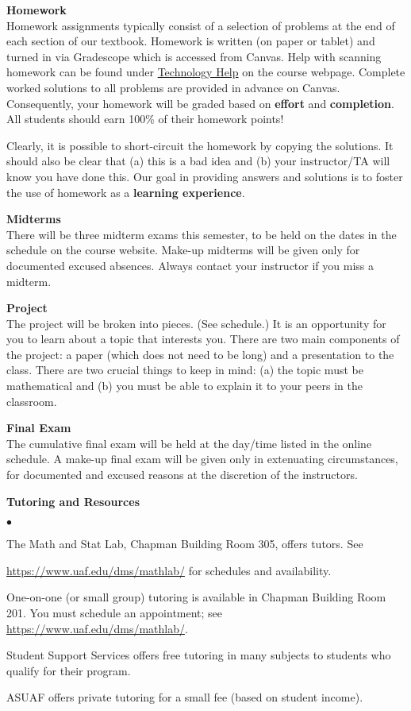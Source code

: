 \documentclass[12pt]{article}
\renewcommand{\emph}[1]{\textsf{\textbf{#1}}}
\newcommand{\localhead}[1]{\par\smallskip\textbf{#1}\nobreak\\}%
\def\heading#1{\localhead{\large\emph{#1}}}
\newenvironment{clist}%
{\bgroup\parskip 0pt\begin{list}{$\bullet$}{\partopsep 4pt\topsep 0pt\itemsep -2pt}}%
{\end{list}\egroup}%
\begin{document}
\heading{Homework}
Homework assignments typically consist of a selection of problems at the end of each section of our textbook. Homework is written (on paper or tablet) and turned in via Gradescope which is accessed from Canvas.  Help with scanning homework can be found under \href{https://jrfaudree.github.io/HOM2023/techHelp.html}{Technology Help} on the course webpage. Complete worked solutions to all problems are provided in advance on Canvas. Consequently, your homework will be graded based on \emph{effort} and \emph{completion}.  All students should earn 100\% of their homework points!

Clearly, it is possible to short-circuit the homework by copying the solutions. It should also be clear that (a) this is a bad idea and (b) your instructor/TA will know you have done this. Our goal in providing answers and solutions is to foster the use of homework as a \emph{learning experience}. 

\heading{Midterms}
There will be three midterm exams this semester, to be held on the dates
in the schedule on the course website. Make-up midterms will be given only for documented excused absences. Always contact your instructor if you miss a midterm.

\heading{Project}
The project will be broken into pieces. (See schedule.) It is an opportunity for you to learn about a topic that interests you. There are two main components of the project: a paper (which does not need to be long) and a presentation to the class. There are two crucial things to keep in mind: (a) the topic must be mathematical and (b) you must be able to explain it to your peers in the classroom. 

\heading{Final Exam} 
The cumulative final exam will be held at the day/time listed in the
online schedule. A make-up final exam will be given only in extenuating circumstances, for documented and excused reasons at the discretion of the instructors.

\heading{Tutoring and Resources}
\vskip -30pt\strut
\begin{clist}
	\item The Math and Stat Lab, Chapman Building Room 305, offers tutors. 
	See 

	\url{https://www.uaf.edu/dms/mathlab/} for schedules and availability.
	\item One-on-one (or small group) tutoring is available in 
Chapman Building Room 201. You must schedule an
appointment; see \url{https://www.uaf.edu/dms/mathlab/}.
	\item Student Support Services offers free tutoring in many subjects to students who qualify for their program.
	\item ASUAF offers private tutoring for a small fee (based on student income).
\end{clist}
\end{document}
